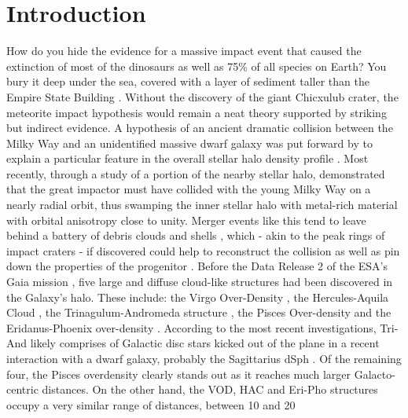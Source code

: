 \documentclass[fleqn,usenatbib]{mnras}
\begin{document}
\section{Introduction}
%
How do you hide the evidence for a massive impact event that caused
the extinction of most of the dinosaurs as well as 75\% of all species
on Earth? You bury it deep under the sea, covered with a layer of
sediment taller than the Empire State Building
\citep[][]{Hildebrand1991}. Without the discovery of the giant
Chicxulub crater, the meteorite impact hypothesis would remain a neat
theory supported by striking but indirect evidence. A hypothesis of an
ancient dramatic collision between the Milky Way and an unidentified
massive dwarf galaxy was put forward by \citet{Deason2013} to explain
a particular feature in the overall stellar halo density profile
\citep[][]{Wa09,Sesar2011,De11}. Most recently, through a study of a
portion of the nearby stellar halo, \citet{Belokurov2018} demonstrated
that the great impactor must have collided with the young Milky Way on
a nearly radial orbit, thus swamping the inner stellar halo with
metal-rich material with orbital anisotropy \citep[see][]{Binney2008}
close to unity. Merger events like this tend to leave behind a battery
of debris clouds and shells \citep[see
  e.g.][]{Johnston2008,Amorisco2015,Hendel2015}, which - akin to the
peak rings of impact craters \citep[see e.g.][]{Morgan2016} - if
discovered could help to reconstruct the collision as well as pin down
the properties of the progenitor \citep[e.g][]{Sanderson2013,Johnston2016}.
%
Before the Data Release 2 \citep[][]{Brown2018} of the ESA's Gaia
mission \citep[][]{Prusti2016}, five large and diffuse cloud-like
structures had been discovered in the Galaxy's halo. These include:
the Virgo Over-Density
\citep[VOD,][]{Vivas2001,Newberg2002,Duffau2006,Juric2008,Bonaca2012},
the Hercules-Aquila Cloud \citep[HAC,][]{Be07,Simion2014}, the
Trinagulum-Andromeda structure
\citep[Tri-And,][]{Rocha2004,Majewski2004,Deason2014}, the Pisces
Over-density \citep[][]{Sesar2007,Wa09,Nie2015} and the
Eridanus-Phoenix over-density \citep[Eri-Pho,][]{Li2016}. According to
the most recent investigations, Tri-And likely comprises of Galactic
disc stars kicked out of the plane in a recent interaction with a
dwarf galaxy, probably the Sagittarius dSph
\citep[e.g.][]{Pr15,Bergemann2018,Hayes2018}. Of the remaining four,
the Pisces overdensity clearly stands out as it reaches much larger
Galacto-centric distances. On the other hand, the VOD, HAC and Eri-Pho
structures occupy a very similar range of distances, between 10 and 20
\end{document}
